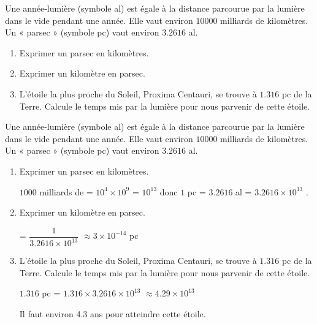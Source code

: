 \begin{exercice*}    
    Une année-lumière (symbole al) est égale à la distance parcourue par la lumière dans le vide
    pendant une année. Elle vaut environ $\num{10000}$ milliards de kilomètres. Un « parsec » (symbole pc) vaut
    environ $\num{3.2616}$ al.
    \begin{enumerate}
        \item Exprimer un parsec en kilomètres.
        \item Exprimer un kilomètre en parsec.
        \item L'étoile la plus proche du Soleil, Proxima Centauri, se trouve à $\num{1.316}$ pc de la Terre. Calcule
        le temps mis par la lumière pour nous parvenir de cette étoile.
    \end{enumerate}
    
\end{exercice*}
\begin{corrige}
    Une année-lumière (symbole al) est égale à la distance parcourue par la lumière dans le vide
    pendant une année. Elle vaut environ $\num{10000}$ milliards de kilomètres. Un « parsec » (symbole pc) vaut
    environ $\num{3.2616}$ al.

    \begin{enumerate}
        \item Exprimer un parsec en kilomètres.
        
        {\red $\num{1000}$ milliards de \Lg[km]{} = $10^4\times 10^9$ \Lg[km]{} = $10^{13}$ \Lg[km]{} 
        donc $1$ pc = $\num{3.2616}$ al = $\num{3.2616}\times 10^{13}$ \Lg[km]{}.        
        }
        \item Exprimer un kilomètre en parsec.
        
        {\red {} = $\dfrac{1}{\num{3.2616}\times 10^{13}}$ \Lg[km]{} $\approx 3\times 10^{-14}$ pc
        }
        \item L'étoile la plus proche du Soleil, Proxima Centauri, se trouve à $\num{1.316}$ pc de la Terre. Calcule
        le temps mis par la lumière pour nous parvenir de cette étoile.

        {\red $\num{1.316}$ pc = $\num{1.316}\times \num{3.2616} \times 10^{13}$ \Lg[km]{} $\approx \num{4.29}\times 10^{13}$ \Lg[km]{}

        Il faut environ \num{4.3} ans pour atteindre cette étoile.        
        }
    \end{enumerate}
\end{corrige}

